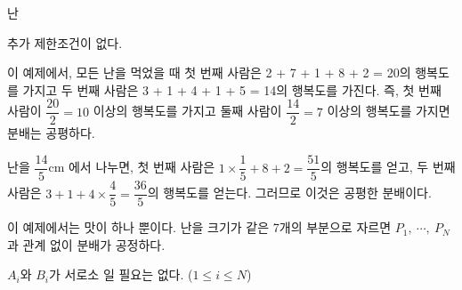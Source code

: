 \begin{problem}{난}
	
	추가 제한조건이 없다.
		
	\Examples
		
	\begin{example}
\end{example}

	이 예제에서, 모든 난을 먹었을 때 첫 번째 사람은 2 + 7 + 1 + 8 + 2 = 20의 행복도를 가지고 두 번째 사람은 3 + 1 + 4 + 1 + 5 = 14의 행복도를 가진다. 즉, 첫 번째 사람이 $\dfrac{20}{2} = 10$ 이상의 행복도를 가지고 둘째 사람이 $\dfrac{14}{2} = 7$ 이상의 행복도를 가지면 분배는 공평하다.
	
	난을 $\dfrac{14}{5}$cm 에서 나누면, 첫 번째 사람은 $1 \times \dfrac{1}{5} + 8 + 2 = \dfrac{51}{5}$의 행복도를 얻고, 두 번째 사람은 $3 + 1 + 4 \times \dfrac{4}{5} = \dfrac{36}{5}$의 행복도를 얻는다. 그러므로 이것은 공평한 분배이다.
	
	\begin{example}
\end{example}

	이 예제에서는 맛이 하나 뿐이다. 난을 크기가 같은 7개의 부분으로 자르면 $P_1, \ \cdots, \  P_N$과 관계 없이 분배가 공정하다.
	

	\begin{example}
\end{example}

	$A_i$와 $B_i$가 서로소 일 필요는 없다. ($1 \le i \le N$)
	
\end{problem}

